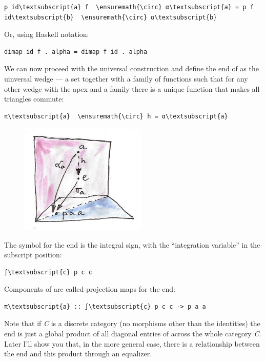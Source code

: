 \begin{Verbatim}[commandchars=\\\{\}]
p id\textsubscript{a} f  \ensuremath{\circ} α\textsubscript{a} = p f id\textsubscript{b}  \ensuremath{\circ} α\textsubscript{b}
\end{Verbatim}
Or, using Haskell notation:

\begin{Verbatim}[commandchars=\\\{\}]
dimap id f . alpha = dimap f id . alpha
\end{Verbatim}
We can now proceed with the universal construction and define the end of
 as the uinversal wedge --- a set  together with a
family of functions  such that for any other wedge with the
apex  and a family  there is a unique function
 that makes all triangles commute:

\begin{Verbatim}[commandchars=\\\{\}]
π\textsubscript{a}  \ensuremath{\circ} h = α\textsubscript{a}
\end{Verbatim}

\begin{figure}[H]
\centering
\includegraphics[width=60mm]{images/end-21.jpg}
\end{figure}

\noindent
The symbol for the end is the integral sign, with the ``integration
variable'' in the subscript position:

\begin{Verbatim}[commandchars=\\\{\}]
∫\textsubscript{c} p c c
\end{Verbatim}
Components of  are called projection maps for the end:

\begin{Verbatim}[commandchars=\\\{\}]
π\textsubscript{a} :: ∫\textsubscript{c} p c c -> p a a
\end{Verbatim}
Note that if \emph{C} is a discrete category (no morphisms other than
the identities) the end is just a global product of all diagonal entries
of  across the whole category \emph{C}. Later I'll show you
that, in the more general case, there is a relationship between the end
and this product through an equalizer.

